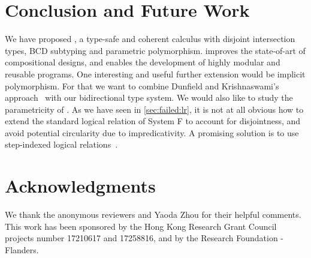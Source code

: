 
\section{Conclusion and Future Work}
\label{sec:conclusion}

We have proposed \fnamee, a type-safe and coherent calculus with disjoint
intersection types, BCD subtyping and parametric polymorphism. \fnamee improves
the state-of-art of compositional designs, and enables the development of highly
modular and reusable programs. One interesting and useful further extension
would be implicit polymorphism. For that we want to combine
Dunfield and Krishnaswami's approach~\cite{dunfield2013complete} with our bidirectional type system.
We would also like to study the parametricity of \fnamee. As we have seen in
\cref{sec:failed:lr}, it is not at all obvious how to extend the standard
logical relation of System F to account for disjointness, and avoid potential
circularity due to impredicativity. A promising solution is to use step-indexed
logical relations~\cite{ahmed2006step}. 


\section*{Acknowledgments}

We thank the anonymous reviewers and Yaoda Zhou for their helpful comments.
This work has been sponsored by the Hong Kong Research Grant
Council projects number 17210617 and 17258816, and by the Research Foundation -
Flanders.



